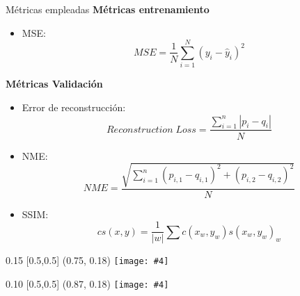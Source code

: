 \documentclass[aspectratio=43]{beamer}
\newcommand{\absimage}[4][0.5,0.5]{%
	\begin{textblock}{#3}%
		[#1]%
		(#2)%
		\texttt{[image: \#4]}%
\end{textblock}}
\begin{document}
\begin{frame}[t]{Métricas empleadas}
  \normalsize \textbf{Métricas entrenamiento}
    \begin{itemize}
      \item \small MSE:
          \small \begin{equation*}
            MSE = \frac{1}{N} \sum_{i=1}^{N} (y_i - \widehat{y}_i)^2
          \end{equation*}
    \end{itemize}

    \normalsize \textbf{Métricas Validación}
    \begin{itemize}
      \item \small Error de reconstrucción:
        \small \begin{equation*}
          Reconstruction \; Loss = \frac{\sum_{i=1}^n |p_i -q_i|}{N}
        \end{equation*}
      \item \small NME:
          \small \begin{equation*}
          NME=\frac{\sqrt{\sum_{i=1}^{n}(p_{i,1} -q_{i,1})^2+ (p_{i,2} -q_{i,2})^2}}{N}
        \end{equation*}
      \item SSIM:
          \small\begin{equation*}
            cs(x,y)=\frac{1}{|w|} \sum{c(x_w,y_w)s(x_w,y_w)}_w
          \end{equation*}
    \end{itemize}
    \absimage{0.75, 0.18}{0.15}{imgs/entrenamiento.png}
    \absimage{0.87, 0.18}{0.10}{imgs/test.png}
\end{frame}
\end{document}
